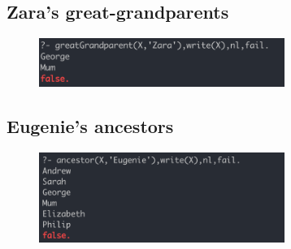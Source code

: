 ﻿\documentclass[a4paper, 11pt]{article}
\begin{document}
\subsection{Zara's great-grandparents}
\begin{figure}[H]
  \centering
  \includegraphics[width=8cm]{Pic/3}
\end{figure}

\subsection{Eugenie's ancestors}
\begin{figure}[H]
  \centering
  \includegraphics[width=8cm]{Pic/4}
\end{figure}


%
%
\end{document}
